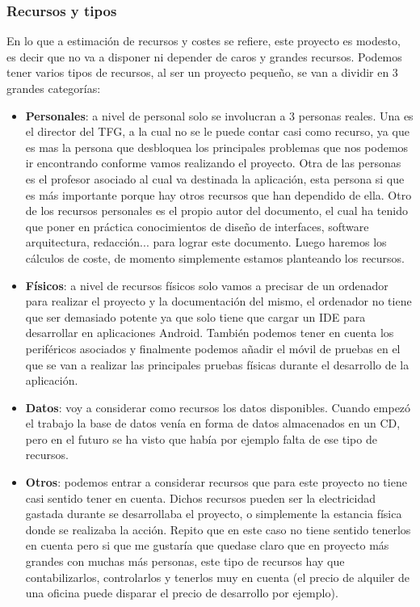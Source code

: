 \subsubsection{Recursos y tipos}

En lo que a estimación de recursos y costes se refiere, este proyecto es modesto, es decir que no va a disponer ni depender de caros y grandes recursos. Podemos tener varios tipos de recursos, al ser un proyecto pequeño, se van a dividir en 3 grandes categorías:
\begin{itemize}
\item \textbf{Personales}: a nivel de personal solo se involucran a 3 personas reales. Una es el director del TFG, a la cual no se le puede contar casi como recurso, ya que es mas la persona que desbloquea los principales problemas que nos podemos ir encontrando conforme vamos realizando el proyecto. Otra de las personas es el profesor asociado al cual va destinada la aplicación, esta persona si que es más importante porque hay otros recursos que han dependido de ella. Otro de los recursos personales es el propio autor del documento, el cual ha tenido que poner en práctica conocimientos de diseño de interfaces, software arquitectura, redacción... para lograr este documento. Luego haremos los cálculos de coste, de momento simplemente estamos planteando los recursos.

\item \textbf{Físicos}: a nivel de recursos físicos solo vamos a precisar de un ordenador para realizar el proyecto y la documentación del mismo, el ordenador no tiene que ser demasiado potente ya que solo tiene que cargar un IDE para desarrollar en aplicaciones Android. También podemos tener en cuenta los periféricos asociados y finalmente podemos añadir el móvil de pruebas en el que se van a realizar las principales pruebas físicas durante el desarrollo de la aplicación. 

\item \textbf{Datos}: voy a considerar como recursos los datos disponibles. Cuando empezó el trabajo la base de datos venía en forma de datos almacenados en un CD, pero en el futuro se ha visto que había por ejemplo falta de ese tipo de recursos.

\item \textbf{Otros}: podemos entrar a considerar recursos que para este proyecto no tiene casi sentido tener en cuenta. Dichos recursos pueden ser la electricidad gastada durante se desarrollaba el proyecto, o simplemente la estancia física donde se realizaba la acción. Repito que en este caso no tiene sentido tenerlos en cuenta pero si que me gustaría que quedase claro que en proyecto más grandes con muchas más personas, este tipo de recursos hay que contabilizarlos, controlarlos y tenerlos muy en cuenta (el precio de alquiler de una oficina puede disparar el precio de desarrollo por ejemplo).
\end{itemize}

